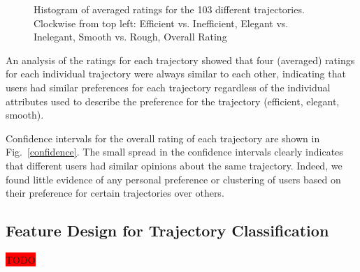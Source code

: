 \documentclass[letterpaper, 10 pt, conference]{ieeeconf}  %
\newcommand{\todo}{\colorbox{red}{TODO}}
\begin{document}
\begin{figure}[t]
  \caption{Histogram of averaged ratings for the 103 different trajectories. Clockwise from top left: Efficient vs. Inefficient, Elegant vs. Inelegant, Smooth vs. Rough, Overall Rating}
\label{fig:survey_raw}
\end{figure}


An analysis of the ratings for each trajectory showed that four (averaged) ratings for each individual trajectory were always similar to each other, indicating that users had similar preferences for each trajectory regardless of the individual attributes used to describe the preference for the trajectory (efficient, elegant, smooth). 

Confidence intervals for the overall rating of each trajectory are shown in Fig.~\ref{confidence}. The small spread in the confidence intervals clearly indicates that different users had similar opinions about the same trajectory. Indeed, we found little evidence of any personal preference or clustering of users based on their preference for certain trajectories over others. 

\subsection{Feature Design for Trajectory Classification}

\todo 
\end{document}
